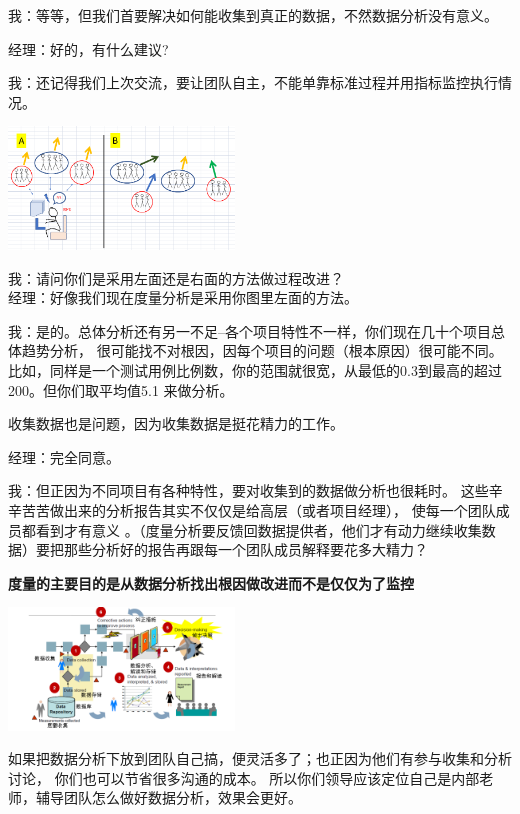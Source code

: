 我：等等，但我们首要解决如何能收集到真正的数据，不然数据分析没有意义。

经理：好的，有什么建议?

我：还记得我们上次交流，要让团队自主，不能单靠标准过程并用指标监控执行情况。


\includegraphics[width=6cm]{Diagram_20.png}

我：请问你们是采用左面还是右面的方法做过程改进？\\
经理：好像我们现在度量分析是采用你图里左面的方法。

我：是的。总体分析还有另一不足--各个项目特性不一样，你们现在几十个项目总体趋势分析，
很可能找不对根因，因每个项目的问题（根本原因）很可能不同。
比如，同样是一个测试用例比例数，你的范围就很宽，从最低的0.3到最高的超过200。但你们取平均值5.1
来做分析。

收集数据也是问题，因为收集数据是挺花精力的工作。

经理：完全同意。

我：但正因为不同项目有各种特性，要对收集到的数据做分析也很耗时。
这些辛辛苦苦做出来的分析报告其实不仅仅是给高层（或者项目经理），
使每一个团队成员都看到才有意义
。（度量分析要反馈回数据提供者，他们才有动力继续收集数据）要把那些分析好的报告再跟每一个团队成员解释要花多大精力？

\textbf{度量的主要目的是从数据分析找出根因做改进而不是仅仅为了监控}


\includegraphics[width=6cm]{Ma4CarScreenshot_2021-12-27_205004.png}

如果把数据分析下放到团队自己搞，便灵活多了；也正因为他们有参与收集和分析讨论，
你们也可以节省很多沟通的成本。
所以你们领导应该定位自己是内部老师，辅导团队怎么做好数据分析，效果会更好。

